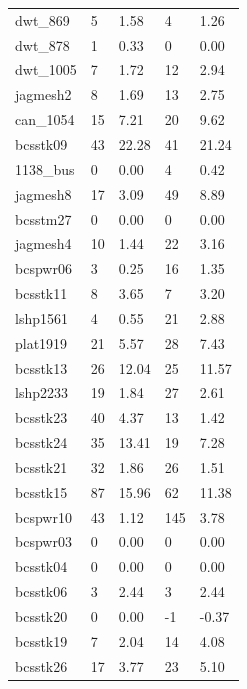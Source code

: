 \begin{table}[h!]
{\begin{tabular}{lllll}
            dwt\_869 & 5 & 1.58 & 4 & 1.26 \\
            dwt\_878 & 1 & 0.33 & 0 & 0.00 \\
            dwt\_1005 & 7 & 1.72 & 12 & 2.94 \\
            jagmesh2 & 8 & 1.69 & 13 & 2.75 \\
            can\_1054 & 15 & 7.21 & 20 & 9.62 \\
            bcsstk09 & 43 & 22.28 & 41 & 21.24 \\
            1138\_bus & 0 & 0.00 & 4 & 0.42 \\
            jagmesh8 & 17 & 3.09 & 49 & 8.89 \\
            bcsstm27 & 0 & 0.00 & 0 & 0.00 \\
            jagmesh4 & 10 & 1.44 & 22 & 3.16 \\
            bcspwr06 & 3 & 0.25 & 16 & 1.35 \\
            bcsstk11 & 8 & 3.65 & 7 & 3.20 \\
            lshp1561 & 4 & 0.55 & 21 & 2.88 \\
            plat1919 & 21 & 5.57 & 28 & 7.43 \\
            bcsstk13 & 26 & 12.04 & 25 & 11.57 \\
            lshp2233 & 19 & 1.84 & 27 & 2.61 \\
            bcsstk23 & 40 & 4.37 & 13 & 1.42 \\
            bcsstk24 & 35 & 13.41 & 19 & 7.28 \\
            bcsstk21 & 32 & 1.86 & 26 & 1.51 \\
            bcsstk15 & 87 & 15.96 & 62 & 11.38 \\
            bcspwr10 & 43 & 1.12 & 145 & 3.78 \\
            bcspwr03 & 0 & 0.00 & 0 & 0.00 \\
            bcsstk04 & 0 & 0.00 & 0 & 0.00 \\
            bcsstk06 & 3 & 2.44 & 3 & 2.44 \\
            bcsstk20 & 0 & 0.00 & -1 & -0.37 \\
            bcsstk19 & 7 & 2.04 & 14 & 4.08 \\
            bcsstk26 & 17 & 3.77 & 23 & 5.10 \\
            \bottomrule
        \end{tabular}
    }{
}
\end{table}

